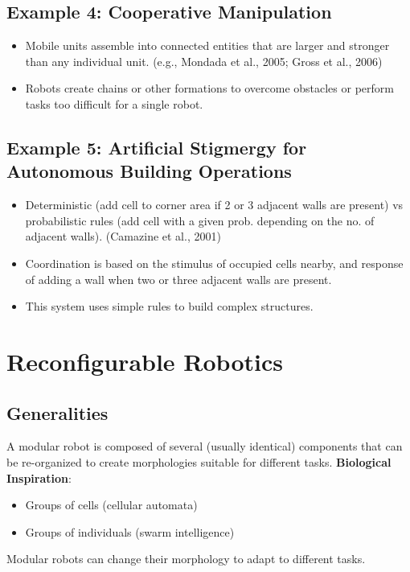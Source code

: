 \subsection*{Example 4: Cooperative Manipulation}
\begin{itemize}
    \item Mobile units assemble into connected entities that are larger and stronger than any individual unit. (e.g., Mondada et al., 2005; Gross et al., 2006)
    \item Robots create chains or other formations to overcome obstacles or perform tasks too difficult for a single robot.
\end{itemize}

\subsection*{Example 5: Artificial Stigmergy for Autonomous Building Operations}
\begin{itemize}
    \item  Deterministic (add cell to corner area if 2 or 3 adjacent walls are present) vs probabilistic rules (add cell with a given prob. depending on the no. of adjacent walls). (Camazine et al., 2001)
    \item  Coordination is based on the stimulus of occupied cells nearby, and response of adding a wall when two or three adjacent walls are present.
    \item  This system uses simple rules to build complex structures.
\end{itemize}

\section{Reconfigurable Robotics}
\subsection*{Generalities}
A modular robot is composed of several (usually identical) components that can be re-organized to create morphologies suitable for different tasks.
\textbf{Biological Inspiration}:
\begin{itemize}
    \item Groups of cells (cellular automata)
    \item Groups of individuals (swarm intelligence)
\end{itemize}
Modular robots can change their morphology to adapt to different tasks.

